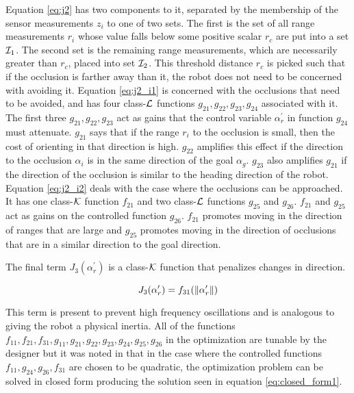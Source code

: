 Equation \ref{eq:j2} has two components to it, separated by the membership of the sensor measurements $z_i$ to one of two sets. 
The first is the set of all range measurements $r_i$ whose value falls below some positive scalar $r_c$ are put into a set ${\cal I}_1$. 
The second set is the remaining range measurements, which are necessarily greater than $r_c$, placed into set ${\cal I}_2$. 
This threshold distance $r_c$ is picked such that if the occlusion is farther away than it, the robot does not need to be concerned with avoiding it.
Equation \ref{eq:j2_i1} is concerned with the occlusions that need to be avoided, and has four class-$\cal L$ functions $g_{21}, g_{22}, g_{23}, g_{24}$ 
associated with it. The first three $g_{21}, g_{22}, g_{23}$ act as gains that the control variable $\alpha_r^\prime$ in function $g_{24}$ must attenuate.
$g_{21}$ says that if the range $r_i$ to the occlusion is small, then the cost of orienting in that direction is high.
$g_{22}$ amplifies this effect if the direction to the occlusion $\alpha_i$ is in the same direction of the goal $\alpha_g$.
$g_{23}$ also amplifies $g_{21}$ if the direction of the occlusion is similar to the heading direction of the robot.
Equation \ref{eq:j2_i2} deals with the case where the occlusions can be approached. It has one class-${\cal K}$ function $f_{21}$ and two
class-${\cal L}$ functions $g_{25}$ and $g_{26}$. $f_{21}$ and $g_{25}$ act as gains on the controlled function $g_{26}$.
$f_{21}$ promotes moving in the direction of ranges that are large and $g_{25}$ promotes moving in the direction of occlusions
that are in a similar direction to the goal direction. 

The final term $J_3(\alpha_r^\prime)$ is a class-${\cal K}$ function that penalizes changes in direction.

\begin{equation}
	J_3(\alpha_r^\prime) = f_{31}(\left\lVert\alpha_r^\prime\right\rVert)
	\label{eq:j3}
\end{equation}

This term is present to prevent high frequency oscillations and is analogous to giving the robot a physical inertia.
All of the functions $f_{11}, f_{21}, f_{31}, g_{11}, g_{21}, g_{22}, g_{23}, g_{24}, g_{25}, g_{26}$ in the optimization are tunable by the designer but
it was noted in \cite{Krishnamurthy07} that in the case where the controlled functions $f_{11}, g_{24}, g_{26}, f_{31}$ are 
chosen to be quadratic, the optimization problem can be solved in closed form producing the solution seen in equation \ref{eq:closed_form1}.

